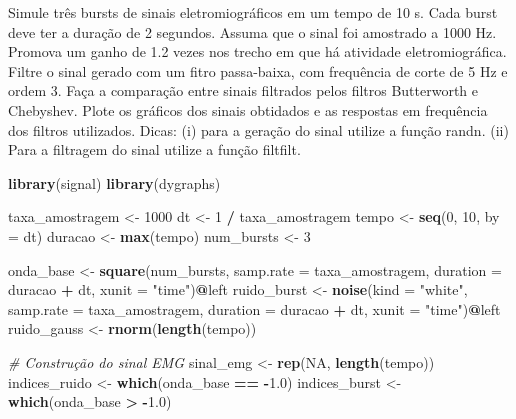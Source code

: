 \documentclass[
]{article}
\newenvironment{Shaded}{\begin{snugshade}}{\end{snugshade}}
\newcommand{\AttributeTok}[1]{\textcolor[rgb]{0.13,0.29,0.53}{#1}}
\newcommand{\CommentTok}[1]{\textcolor[rgb]{0.56,0.35,0.01}{\textit{#1}}}
\newcommand{\ConstantTok}[1]{\textcolor[rgb]{0.56,0.35,0.01}{#1}}
\newcommand{\DecValTok}[1]{\textcolor[rgb]{0.00,0.00,0.81}{#1}}
\newcommand{\FloatTok}[1]{\textcolor[rgb]{0.00,0.00,0.81}{#1}}
\newcommand{\FunctionTok}[1]{\textcolor[rgb]{0.13,0.29,0.53}{\textbf{#1}}}
\newcommand{\NormalTok}[1]{#1}
\newcommand{\OtherTok}[1]{\textcolor[rgb]{0.56,0.35,0.01}{#1}}
\newcommand{\SpecialCharTok}[1]{\textcolor[rgb]{0.81,0.36,0.00}{\textbf{#1}}}
\newcommand{\StringTok}[1]{\textcolor[rgb]{0.31,0.60,0.02}{#1}}
\begin{document}
Simule três bursts de sinais eletromiográficos em um tempo de 10 s. Cada
burst deve ter a duração de 2 segundos. Assuma que o sinal foi amostrado
a 1000 Hz. Promova um ganho de 1.2 vezes nos trecho em que há atividade
eletromiográfica. Filtre o sinal gerado com um fitro passa-baixa, com
frequência de corte de 5 Hz e ordem 3. Faça a comparação entre sinais
filtrados pelos filtros Butterworth e Chebyshev. Plote os gráficos dos
sinais obtidados e as respostas em frequência dos filtros utilizados.
Dicas: (i) para a geração do sinal utilize a função randn. (ii) Para a
filtragem do sinal utilize a função filtfilt.

\begin{Shaded}
\begin{Highlighting}[]
\FunctionTok{library}\NormalTok{(signal)}
\FunctionTok{library}\NormalTok{(dygraphs)}

\NormalTok{taxa\_amostragem }\OtherTok{\textless{}{-}} \DecValTok{1000}
\NormalTok{dt }\OtherTok{\textless{}{-}} \DecValTok{1} \SpecialCharTok{/}\NormalTok{ taxa\_amostragem}
\NormalTok{tempo }\OtherTok{\textless{}{-}} \FunctionTok{seq}\NormalTok{(}\DecValTok{0}\NormalTok{, }\DecValTok{10}\NormalTok{, }\AttributeTok{by =}\NormalTok{ dt)}
\NormalTok{duracao }\OtherTok{\textless{}{-}} \FunctionTok{max}\NormalTok{(tempo)}
\NormalTok{num\_bursts }\OtherTok{\textless{}{-}} \DecValTok{3}

\NormalTok{onda\_base }\OtherTok{\textless{}{-}} \FunctionTok{square}\NormalTok{(num\_bursts, }\AttributeTok{samp.rate =}\NormalTok{ taxa\_amostragem, }\AttributeTok{duration =}\NormalTok{ duracao }\SpecialCharTok{+}\NormalTok{ dt, }\AttributeTok{xunit =} \StringTok{"time"}\NormalTok{)}\SpecialCharTok{@}\NormalTok{left}
\NormalTok{ruido\_burst }\OtherTok{\textless{}{-}} \FunctionTok{noise}\NormalTok{(}\AttributeTok{kind =} \StringTok{"white"}\NormalTok{, }\AttributeTok{samp.rate =}\NormalTok{ taxa\_amostragem, }\AttributeTok{duration =}\NormalTok{ duracao }\SpecialCharTok{+}\NormalTok{ dt, }\AttributeTok{xunit =} \StringTok{"time"}\NormalTok{)}\SpecialCharTok{@}\NormalTok{left}
\NormalTok{ruido\_gauss }\OtherTok{\textless{}{-}} \FunctionTok{rnorm}\NormalTok{(}\FunctionTok{length}\NormalTok{(tempo))}

\CommentTok{\# Construção do sinal EMG}
\NormalTok{sinal\_emg }\OtherTok{\textless{}{-}} \FunctionTok{rep}\NormalTok{(}\ConstantTok{NA}\NormalTok{, }\FunctionTok{length}\NormalTok{(tempo))}
\NormalTok{indices\_ruido }\OtherTok{\textless{}{-}} \FunctionTok{which}\NormalTok{(onda\_base }\SpecialCharTok{==} \SpecialCharTok{{-}}\FloatTok{1.0}\NormalTok{)}
\NormalTok{indices\_burst }\OtherTok{\textless{}{-}} \FunctionTok{which}\NormalTok{(onda\_base }\SpecialCharTok{\textgreater{}} \SpecialCharTok{{-}}\FloatTok{1.0}\NormalTok{)}


\end{Highlighting}
\end{Shaded}
\end{document}

